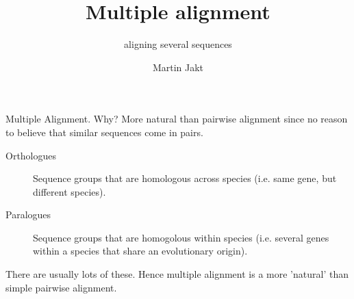 \documentclass[pdf]{beamer}
\title{Multiple alignment}
\subtitle{aligning several sequences}
\author{Martin Jakt}
\begin{document}
\begin{frame}
  \titlepage
\end{frame}

\begin{frame}{Multiple Alignment. Why?}
  More natural than pairwise alignment since no reason to
  believe that similar sequences come in pairs.
  \pause
  \begin{description}
  \item[Orthologues] Sequence groups that are homologous across species
    (i.e. same gene, but different species).
  \item[Paralogues] Sequence groups that are homogolous within species
    (i.e. several genes within a species that share an evolutionary origin).
  \end{description}
  \pause

  There are usually lots of these. Hence multiple alignment is a more 'natural'
  than simple pairwise alignment.  
\end{frame}
\end{document}
